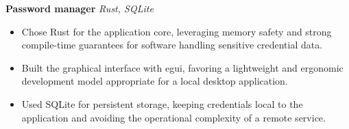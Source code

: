 \textbf{Password manager} \hfill \textit{Rust, SQLite}

\begin{itemize}
    \item Chose Rust for the application core, leveraging memory safety and strong compile-time guarantees for software handling sensitive credential data.
    \item Built the graphical interface with egui, favoring a lightweight and ergonomic development model appropriate for a local desktop application.
    \item Used SQLite for persistent storage, keeping credentials local to the application and avoiding the operational complexity of a remote service.
\end{itemize}